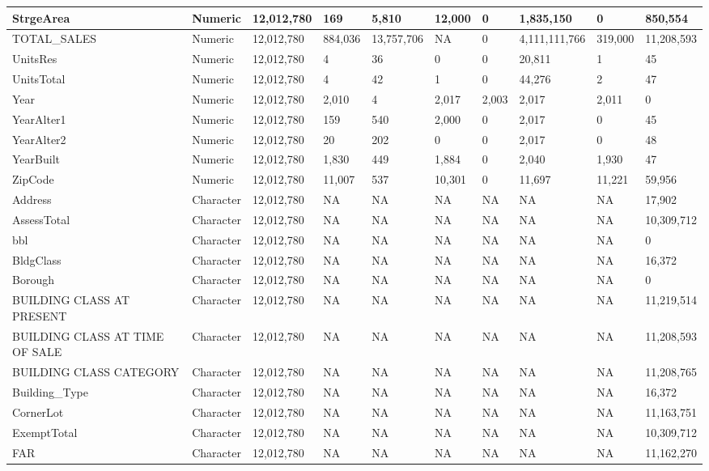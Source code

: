 \documentclass[conference,final,]{IEEEtran}
\begin{document}
\begin{table}
\begin{tabular}[t]{l|l|l|l|l|l|l|l|l|l}
\hline
StrgeArea & Numeric & 12,012,780 & 169 & 5,810 & 12,000 & 0 & 1,835,150 & 0 & 850,554\\
\hline
TOTAL\_SALES & Numeric & 12,012,780 & 884,036 & 13,757,706 & NA & 0 & 4,111,111,766 & 319,000 & 11,208,593\\
\hline
UnitsRes & Numeric & 12,012,780 & 4 & 36 & 0 & 0 & 20,811 & 1 & 45\\
\hline
UnitsTotal & Numeric & 12,012,780 & 4 & 42 & 1 & 0 & 44,276 & 2 & 47\\
\hline
Year & Numeric & 12,012,780 & 2,010 & 4 & 2,017 & 2,003 & 2,017 & 2,011 & 0\\
\hline
YearAlter1 & Numeric & 12,012,780 & 159 & 540 & 2,000 & 0 & 2,017 & 0 & 45\\
\hline
YearAlter2 & Numeric & 12,012,780 & 20 & 202 & 0 & 0 & 2,017 & 0 & 48\\
\hline
YearBuilt & Numeric & 12,012,780 & 1,830 & 449 & 1,884 & 0 & 2,040 & 1,930 & 47\\
\hline
ZipCode & Numeric & 12,012,780 & 11,007 & 537 & 10,301 & 0 & 11,697 & 11,221 & 59,956\\
\hline
Address & Character & 12,012,780 & NA & NA & NA & NA & NA & NA & 17,902\\
\hline
AssessTotal & Character & 12,012,780 & NA & NA & NA & NA & NA & NA & 10,309,712\\
\hline
bbl & Character & 12,012,780 & NA & NA & NA & NA & NA & NA & 0\\
\hline
BldgClass & Character & 12,012,780 & NA & NA & NA & NA & NA & NA & 16,372\\
\hline
Borough & Character & 12,012,780 & NA & NA & NA & NA & NA & NA & 0\\
\hline
BUILDING CLASS AT PRESENT & Character & 12,012,780 & NA & NA & NA & NA & NA & NA & 11,219,514\\
\hline
BUILDING CLASS AT TIME OF SALE & Character & 12,012,780 & NA & NA & NA & NA & NA & NA & 11,208,593\\
\hline
BUILDING CLASS CATEGORY & Character & 12,012,780 & NA & NA & NA & NA & NA & NA & 11,208,765\\
\hline
Building\_Type & Character & 12,012,780 & NA & NA & NA & NA & NA & NA & 16,372\\
\hline
CornerLot & Character & 12,012,780 & NA & NA & NA & NA & NA & NA & 11,163,751\\
\hline
ExemptTotal & Character & 12,012,780 & NA & NA & NA & NA & NA & NA & 10,309,712\\
\hline
FAR & Character & 12,012,780 & NA & NA & NA & NA & NA & NA & 11,162,270\\

\end{tabular}
\end{table}
\end{document}
